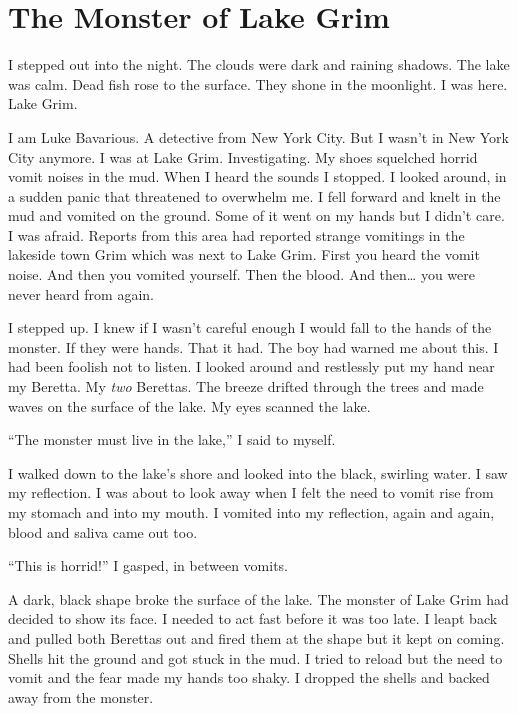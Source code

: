 \chapter{The Monster of Lake Grim}



I stepped out into the night. The clouds were dark and raining
shadows. The lake was calm. Dead fish rose to the surface. They
shone in the moonlight. I was here. Lake Grim.



I am Luke Bavarious. A detective from New York City. But I
wasn't in New York City anymore. I was at Lake Grim.
Investigating. My shoes squelched horrid vomit noises in the mud.
When I heard the sounds I stopped. I looked around, in a sudden
panic that threatened to overwhelm me. I fell forward and knelt in
the mud and vomited on the ground. Some of it went on my hands but
I didn't care. I was afraid. Reports from this area had
reported strange vomitings in the lakeside town Grim which was next
to Lake Grim. First you heard the vomit noise. And then you vomited
yourself. Then the blood. And then{\ldots} you were never heard
from again.



I stepped up. I knew if I wasn't careful enough I would fall to the
hands of the monster. If they were hands. That it had. The boy had
warned me about this. I had been foolish not to listen. I looked around
and restlessly put my hand near my Beretta. My {\em two} Berettas. The
breeze drifted through the trees and made waves on the surface of the
lake. My eyes scanned the lake.



``The monster must live in the lake,'' I said to
myself.



I walked down to the lake's shore and looked into the black,
swirling water. I saw my reflection. I was about to look away when
I felt the need to vomit rise from my stomach and into my mouth. I
vomited into my reflection, again and again, blood and saliva came
out too.



``This is horrid!'' I gasped, in between vomits.



A dark, black shape broke the surface of the lake. The monster of
Lake Grim had decided to show its face. I needed to act fast before
it was too late. I leapt back and pulled both Berettas out and
fired them at the shape but it kept on coming. Shells hit the
ground and got stuck in the mud. I tried to reload but the need to
vomit and the fear made my hands too shaky. I dropped the shells
and backed away from the monster.



